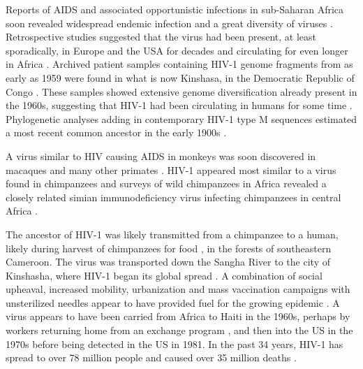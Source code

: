 \documentclass[../sherrill-Mix_thesis.tex]{subfiles}
\begin{document}
	Reports of AIDS and associated opportunistic infections in sub-Saharan Africa soon revealed widespread endemic infection \citep{Clumeck1983,Clumeck1984,VandePerre1984,Piot1984} and a great diversity of viruses \citep{Nkengasong1994,Louwagie1995,Vidal2000,Rambaut2001,Yang2001,Kalish2004}. Retrospective studies suggested that the virus had been present, at least sporadically, in Europe and the USA for decades \citep{Froland1988,Garry1988} and circulating for even longer in Africa \citep{Bygbjerg1983,Vandepitte1983,Clumeck1984,Nahmias1986,Zhu1998,Worobey2008}. Archived patient samples containing HIV-1 genome fragments from as early as 1959 were found in what is now Kinshasa, in the Democratic Republic of Congo \citep{Nahmias1986}. These samples showed extensive genome diversification already present in the 1960s, suggesting that HIV-1 had been circulating in humans for some time \citep{Zhu1998,Worobey2008}. Phylogenetic analyses adding in contemporary HIV-1 type M sequences estimated a most recent common ancestor in the early 1900s \citep{Korber2000,Salemi2001,Sharp2001,Yusim2001,Worobey2008,Faria2014}.
	
	A virus similar to HIV causing AIDS in monkeys was soon discovered in macaques \citep{Daniel1985,Peeters1989} and many other primates \citep{Peeters2001}. HIV-1 appeared most similar to a virus found in chimpanzees \citep{Peeters1989,Huet1990} and surveys of wild chimpanzees in Africa revealed a closely related simian immunodeficiency virus infecting chimpanzees in central Africa \citep{Gao1999,Keele2006,VanHeuverswyn2007}.
	
	The ancestor of HIV-1 was likely transmitted from a chimpanzee to a human, likely during harvest of chimpanzees for food \citep{Bowen-Jones1999,Hahn2000,Peeters2002,Wolfe2004,Wolfe2005,Kalish2005}, in the forests of southeastern Cameroon. The virus was transported down the Sangha River \citep{Sharp2008} to the city of Kinshasha, where HIV-1 began its global spread \citep{Vidal2000,Vangroenweghe2001,Worobey2008,Faria2014}. A combination of social upheaval, increased mobility, urbanization and mass vaccination campaigns with unsterilized needles appear to have provided fuel for the growing epidemic \citep{Chitnis2000,deSousa2010,deSousa2012,Faria2014}. A virus appears to have been carried from Africa to Haiti in the 1960s, perhaps by workers returning home from an exchange program \citep{Piot1984,Vangroenweghe2001}, and then into the US in the 1970s \citep{Gilbert2007} before being detected in the US in 1981. In the past 34 years, HIV-1 has spread to over 78 million people and caused over 35 million deaths \citep{UNAIDSCGA2014}.
\end{document}
